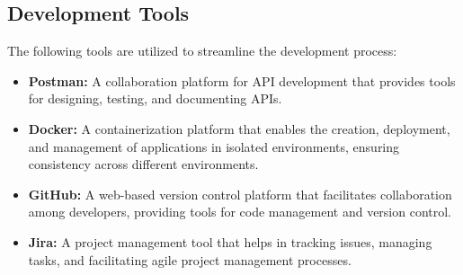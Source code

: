 \subsection{Development Tools}
The following tools are utilized to streamline the development process:
\begin{itemize}
    \item \textbf{Postman:} A collaboration platform for API development that provides tools for designing, testing, and documenting APIs.
    \item \textbf{Docker:} A containerization platform that enables the creation, deployment, and management of applications in isolated environments, ensuring consistency across different environments.
    \item \textbf{GitHub:} A web-based version control platform that facilitates collaboration among developers, providing tools for code management and version control.
    \item \textbf{Jira:} A project management tool that helps in tracking issues, managing tasks, and facilitating agile project management processes.
\end{itemize}





